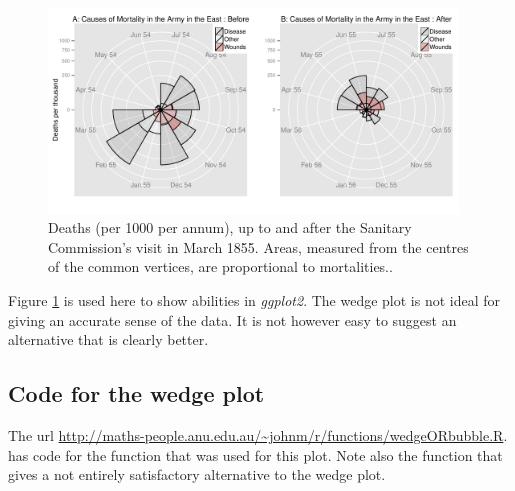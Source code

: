 \begin{figure}
\centerline{\includegraphics[width=0.97\textwidth]{colorArt/allwedge}}%
\caption{Deaths (per 1000 per annum), up to and after the
  Sanitary Commission's visit in March 1855.  Areas, measured from the
centres of the common vertices, are proportional
  to mortalities..\label{col:wedgeplot}}
\end{figure}

Figure \ref{col:wedgeplot} is used here to show abilities in
\textit{ggplot2}.  The wedge plot is not ideal for giving an accurate
sense of the data.  It is not however easy to suggest an alternative
that is clearly better.

\subsection*{ Code for the wedge plot}

The url
\url{http://maths-people.anu.edu.au/~johnm/r/functions/wedgeORbubble.R}. has code for the function  that was
used for this plot.  Note also the function  that
gives a not entirely satisfactory alternative to the wedge plot.

\newpage
